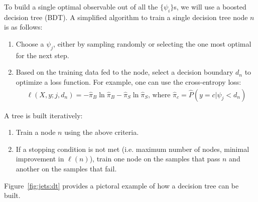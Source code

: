 To build a single optimal observable out of all the $\{\psi_i\}$s, we will use a boosted decision tree (BDT).
A simplified algorithm to train a single decision tree node $n$ is as follows:
\begin{enumerate}
    \item Choose a $\psi_j$, either by sampling randomly or selecting the one most optimal for the next step.
    \item Based on the training data fed to the node, select a decision boundary $d_n$ to optimize a loss function. For example, one can use the cross-entropy loss:
        \begin{gather}
            \ell(X,y;j,d_n) =  -\hat\pi_B\ln\hat\pi_B -\hat\pi_S\ln\hat\pi_S \text{, where } 
            \hat\pi_c = \hat P(y=c | \psi_j < d_n) 
        \end{gather}
\end{enumerate}
A tree is built iteratively:
\begin{enumerate}
    \item Train a node $n$ using the above criteria. 
    \item If a stopping condition is not met (i.e. maximum number of nodes, minimal improvement in $\ell(n)$), train one node on the samples that pass $n$ and another on the samples that fail.
\end{enumerate}
Figure~\ref{fig:jets:dt} provides a pictoral example of how a decision tree can be built. 


